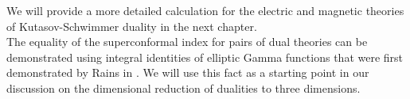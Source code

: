 We will provide a more detailed calculation for the electric and magnetic theories of Kutasov-Schwimmer duality in the next chapter.
\\
The equality of the superconformal index for pairs of dual theories can be demonstrated using integral identities of elliptic Gamma functions that were first demonstrated by Rains in \cite{rains309252transformations}.
We will use this fact as a starting point in our discussion on the dimensional reduction of dualities to three dimensions.








